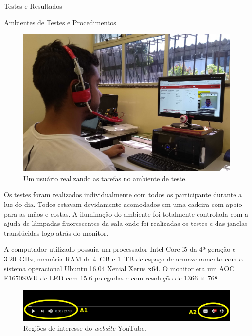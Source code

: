 \begin{chapter}{Testes e Resultados}
\begin{section}{Ambientes de Testes e Procedimentos}
\begin{figure}[!h]
	\centering
	\includegraphics[width=1.00\linewidth]{fig/denes}
	\caption{Um usuário realizando as tarefas no ambiente de teste.}
	\label{fig:ambiente}
\end{figure}

Os testes foram realizados individualmente com todos os participante durante a
luz do dia. Todos estavam devidamente acomodados em uma cadeira com apoio para
as mãos e costas. A iluminação do ambiente foi totalmente controlada com a ajuda
de lâmpadas fluorescentes da sala onde foi realizadas os testes e das janelas
translúcidas logo atrás do monitor. 

A computador utilizado possuia um processador Intel Core i5 da 4ª geração e
3.20~GHz, memória RAM de 4~GB e 1~TB de espaço de armazenamento com o sistema
operacional Ubuntu 16.04 Xenial Xerus x64. O monitor era um AOC E1670SWU de LED
com 15.6 polegadas e com resolução de 1366 $\times$ 768.

\begin{figure}[!h]
	\centering
	\includegraphics[width=1.00\linewidth]{fig/YT}
	\caption{Regiões de interesse do \textit{website} YouTube.}
	\label{fig:youtube}
\end{figure}


\end{section}
\end{chapter}
